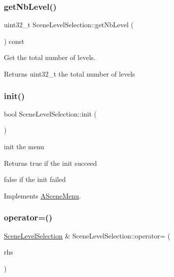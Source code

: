 \subsubsection{\texorpdfstring{get\+Nb\+Level()}{getNbLevel()}}
{\footnotesize\ttfamily uint32\+\_\+t Scene\+Level\+Selection\+::get\+Nb\+Level (\begin{DoxyParamCaption}{ }\end{DoxyParamCaption}) const}



Get the total number of levels. 

\begin{DoxyReturn}{Returns}
uint32\+\_\+t the total number of levels 
\end{DoxyReturn}
\mbox{\label{class_scene_level_selection_ab6374f18220f26c22e062bfacc2ff962}} 
\subsubsection{\texorpdfstring{init()}{init()}}
{\footnotesize\ttfamily bool Scene\+Level\+Selection\+::init (\begin{DoxyParamCaption}{ }\end{DoxyParamCaption})\hspace{0.3cm}{\ttfamily [virtual]}}



init the menu 

\begin{DoxyReturn}{Returns}
true if the init succeed 

false if the init failed 
\end{DoxyReturn}


Implements \hyperlink{class_a_scene_menu_a78bdee98bd7df224524586a060f9bdec}{A\+Scene\+Menu}.

\mbox{\label{class_scene_level_selection_aca281d3eb620da5c05951fa128d5aa9f}} 
\subsubsection{\texorpdfstring{operator=()}{operator=()}}
{\footnotesize\ttfamily \hyperlink{class_scene_level_selection}{Scene\+Level\+Selection} \& Scene\+Level\+Selection\+::operator= (\begin{DoxyParamCaption}\item[{\hyperlink{class_scene_level_selection}{Scene\+Level\+Selection} const \&}]{rhs }\end{DoxyParamCaption})}



